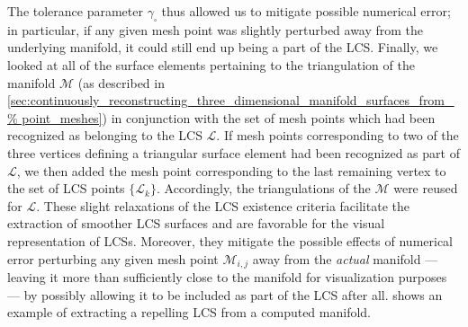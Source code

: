 The tolerance parameter $\gamma_{\square}$ thus allowed us to mitigate possible
numerical error; in particular, if any given mesh point was slightly perturbed
away from the underlying manifold, it could still end up being a part of the
LCS. Finally, we looked at all of the surface elements pertaining to the
triangulation of the manifold $\mathcal{M}$ (as described in
\cref{sec:continuously_reconstructing_three_dimensional_manifold_surfaces_from_%
point_meshes}) in conjunction with the set of mesh points which had been
recognized as belonging to the LCS $\mathcal{L}$. If mesh points corresponding
to two of the three vertices defining a triangular surface element had been
recognized as part of $\mathcal{L}$, we then added the mesh point corresponding
to the last remaining vertex to the set of LCS points $\{\mathcal{L}_{k}\}$.
Accordingly, the triangulations of the $\mathcal{M}$ were reused for
$\mathcal{L}$. These slight relaxations of the LCS existence criteria
facilitate the extraction of smoother LCS surfaces and are favorable for the
visual representation of LCSs. Moreover, they mitigate the possible effects of
numerical error perturbing any given mesh point $\mathcal{M}_{i,j}$ away from
the \emph{actual} manifold --- leaving it more than sufficiently close to the
manifold for visualization purposes --- by possibly allowing it to be included
as part of the LCS after all.  shows an
example of extracting a repelling LCS from a computed manifold.



